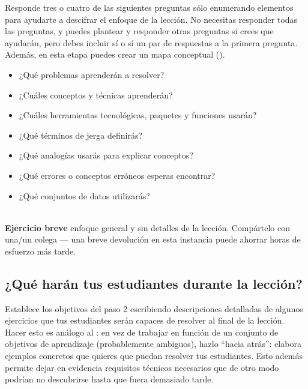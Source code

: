Responde tres o cuatro de las siguientes preguntas sólo enumerando elementos
para ayudarte a descifrar el enfoque de la lección.
No necesitas responder todas las preguntas,
y puedes plantear y responder otras preguntas si crees que ayudarán,
pero debes incluir sí o sí un par de respuestas a la primera pregunta.
Además, en esta etapa puedes crear un mapa conceptual ().

\begin{itemize}

\item
  ¿Qué problemas aprenderán a resolver?

\item
  ¿Cuáles conceptos y técnicas aprenderán?

\item
  ¿Cuáles herramientas tecnológicas, paquetes y funciones usarán?

\item
  ¿Qué términos de jerga definirás?

\item
  ¿Qué analogías usarás para explicar conceptos?

\item
  ¿Qué errores o conceptos erróneos esperas encontrar?

\item
  ¿Qué conjuntos de datos utilizarás?

\end{itemize}

~\\
\noindent
\textbf{Ejercicio breve}
enfoque general y sin detalles de la lección.
Compártelo con una/un colega --- una breve devolución en esta instancia
puede ahorrar horas de esfuerzo más tarde.

\subsection*{¿Qué harán tus estudiantes durante la lección?}

Establece los objetivos del paso 2 escribiendo descripciones detalladas de
algunos ejercicios que tus estudiantes serán capaces de resolver al final de la lección.
Hacer esto es análogo al :
en vez de trabajar en función de un conjunto de objetivos de aprendizaje (probablemente ambiguos),
hazlo ``hacia atrás'': elabora ejemplos concretos que quieres que puedan resolver tus estudiantes.
Esto además permite dejar en evidencia requisitos técnicos necesarios
que de otro modo podrían no descubrirse hasta que fuera demasiado tarde.

